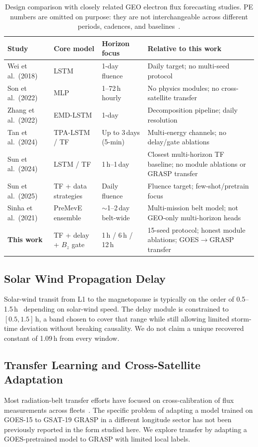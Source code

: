 \documentclass{ieeeaccess}
\begin{document}
\begin{table}[!htbp]
\centering
\caption{Design comparison with closely related GEO electron flux forecasting studies.
PE numbers are omitted on purpose: they are not interchangeable across different
periods, cadences, and baselines~\cite{b21,b22}.}
\label{tab:compare}
\begin{tabular}{@{}lp{2.0cm}p{2.3cm}p{4.0cm}@{}}
\toprule
\textbf{Study} & \textbf{Core model} & \textbf{Horizon focus} & \textbf{Relative to this work} \\
\midrule
Wei et al.\ (2018) & LSTM & 1-day fluence & Daily target; no multi-seed protocol \\
Son et al.\ (2022) & MLP & 1--72\,h hourly & No physics modules; no cross-satellite transfer \\
Zhang et al.\ (2022) & EMD-LSTM & 1-day & Decomposition pipeline; daily resolution \\
Tan et al.\ (2024) & TPA-LSTM / TF & Up to 3\,days (5-min) & Multi-energy channels; no delay/gate ablations \\
Sun et al.\ (2024) & LSTM / TF & 1\,h--1\,day & Closest multi-horizon TF baseline; no module ablations or GRASP transfer \\
Sun et al.\ (2025) & TF + data strategies & Daily fluence & Fluence target; few-shot/pretrain focus \\
Sinha et al.\ (2021) & PreMevE ensemble & $\sim$1--2\,day belt-wide & Multi-mission belt model; not GEO-only multi-horizon heads \\
\textbf{This work} & TF + delay + \(B_z\) gate & 1\,h / 6\,h / 12\,h & 15-seed protocol; honest module ablations; GOES$\rightarrow$GRASP transfer \\
\bottomrule
\end{tabular}
\end{table}

\subsection{Solar Wind Propagation Delay}
Solar-wind transit from L1 to the magnetopause is typically on the order of 0.5--1.5\,h~\cite{b27} depending on solar-wind speed. The delay module is constrained to \([0.5, 1.5]\,\mathrm{h}\), a band chosen to cover that range while still allowing limited storm-time deviation without breaking causality. We do not claim a unique recovered constant of 1.09\,h from every window.

\subsection{Transfer Learning and Cross-Satellite Adaptation}
Most radiation-belt transfer efforts have focused on cross-calibration of flux
measurements across fleets~\cite{b25}. The specific problem of adapting a model
trained on GOES-15 to GSAT-19 GRASP in a different longitude sector has not been
previously reported in the form studied here. We explore transfer by adapting
a GOES-pretrained model to GRASP with limited local labels.
\end{document}
